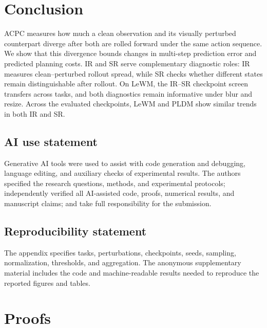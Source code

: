 \documentclass{article}
\begin{document}
\section{Conclusion}\label{sec:conc}

ACPC measures how much a clean observation and its visually perturbed
counterpart diverge after both are rolled forward under the same action
sequence. We show that this divergence bounds changes in multi-step prediction
error and predicted planning costs. IR and SR serve complementary diagnostic
roles: IR measures clean--perturbed rollout spread, while SR checks whether
different states remain distinguishable after rollout. On LeWM, the IR--SR
checkpoint screen transfers across tasks, and both diagnostics remain
informative under blur and resize. Across the evaluated checkpoints, LeWM and
PLDM show similar trends in both IR and SR\label{sec:main-text-end}.

\clearpage
\subsection*{AI use statement}
Generative AI tools were used to assist with code generation and debugging,
language editing, and auxiliary checks of experimental results. The authors
specified the research questions, methods, and experimental protocols;
independently verified all AI-assisted code, proofs, numerical results, and
manuscript claims; and take full responsibility for the submission.

\subsection*{Reproducibility statement}
The appendix specifies tasks, perturbations, checkpoints, seeds, sampling,
normalization, thresholds, and aggregation. The anonymous supplementary
material includes the code and machine-readable results needed to reproduce
the reported figures and tables.




\FloatBarrier
\appendix
\section{Proofs}\label{sec:appendix-acpc-proofs}
\end{document}
